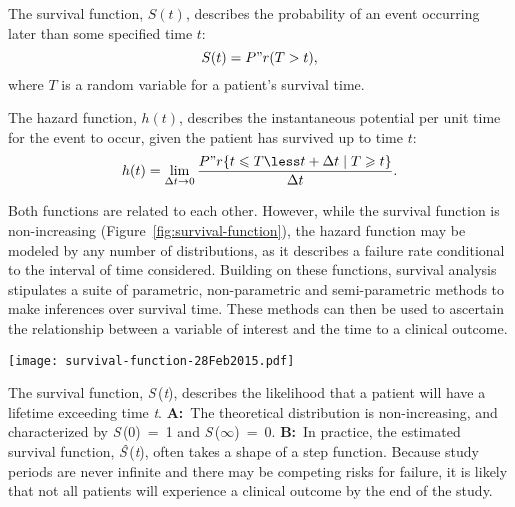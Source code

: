 The survival function, $S(t)$, describes the probability of an event occurring
later than some specified time $t$:
\begin{equation}
  \label{eq:survival-function}
  S(t) = P"r(T > t),
\end{equation}
where $T$ is a random variable for a patient's survival time.

The hazard function, $h(t)$, describes the instantaneous potential per unit time
for the event to occur, given the patient has survived up to time $t$:
\begin{equation}
  \label{eq:hazard-function}
  h(t) = \lim_{\Delta t \to 0}\frac{P"r\{t \leqslant T \less t + \Delta t
    \mid T \geqslant t \}}{\Delta t}.
\end{equation}


Both functions are related to each other.  However, while the survival function
is non-increasing (Figure~\ref{fig:survival-function}), the hazard function may
be modeled by any number of distributions, as it describes a failure rate
conditional to the interval of time considered.  Building on these functions,
survival analysis stipulates a suite of parametric, non-parametric and
semi-parametric methods to make inferences over survival time.  These methods
can then be used to ascertain the relationship between a variable of interest
and the time to a clinical outcome.

\begin{marginfigure}%
  \texttt{[image: survival-function-28Feb2015.pdf]}
  \caption[Survival function]{The survival function, \emph{S}\,(\emph{t}),
    describes the likelihood that a patient will have a lifetime exceeding time
    \emph{t}.  \textbf{A:}~The theoretical distribution is non-increasing, and
    characterized by \mbox{\emph{S}\,(0) = 1} and \mbox{\emph{S}\,($\infty$) =
      0}.  \textbf{B:}~In practice, the estimated survival function,
    \emph{\^{S}}\,(\emph{t}), often takes a shape of a step function.  Because
    study periods are never infinite and there may be competing risks for
    failure, it is likely that not all patients will experience a clinical
    outcome by the end of the study.}\label{fig:survival-function}%
\end{marginfigure}

